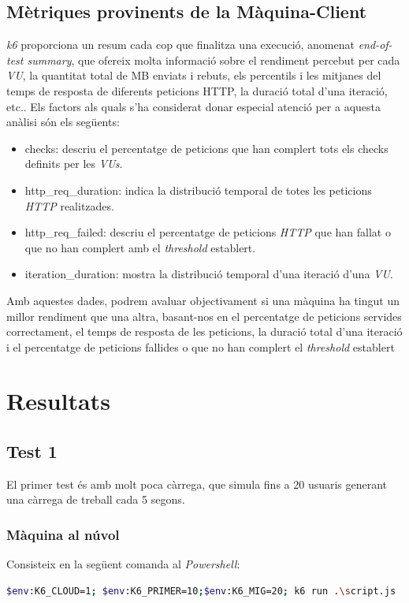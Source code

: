 \subsection{Mètriques provinents de la Màquina-Client}

\textit{k6} proporciona un resum cada cop que finalitza una execució, anomenat \textit{end-of-test summary}, que ofereix molta informació sobre el rendiment percebut per cada \textit{VU}, la quantitat total de MB enviats i rebuts, els percentils i les mitjanes del temps de resposta de diferents peticions HTTP, la duració total d'una iteració, etc.\cite{grafana_results_nodate}. Els factors als quals s'ha considerat donar especial atenció per a aquesta anàlisi són els següents:
\begin{itemize}
    \item checks: descriu el percentatge de peticions que han complert tots els checks definits per les \textit{VUs}.
    \item http\_req\_duration: indica la distribució temporal de totes les peticions \textit{HTTP} realitzades.
    \item http\_req\_failed: descriu el percentatge de peticions \textit{HTTP} que han fallat o que no han complert amb el \textit{threshold} establert.
    \item iteration\_duration: mostra la distribució temporal d'una iteració d'una \textit{VU}.
\end{itemize}
Amb aquestes dades, podrem avaluar objectivament si una màquina ha tingut un millor rendiment que una altra, basant-nos en el percentatge de peticions servides correctament, el temps de resposta de les peticions, la duració total d'una iteració i el percentatge de peticions fallides o que no han complert el \textit{threshold} establert

\newpage
\section{Resultats}
\label{11:resultats}

\subsection{Test 1}

El primer test és amb molt poca càrrega, que simula fins a 20 usuaris generant una càrrega de treball cada 5 segons.

\subsubsection{Màquina al núvol}
Consisteix en la següent comanda al \textit{Powershell}:
\begin{lstlisting}[language=bash, caption=Test 1 al núvol]
    $env:K6_CLOUD=1; $env:K6_PRIMER=10;$env:K6_MIG=20; k6 run .\script.js
\end{lstlisting}

